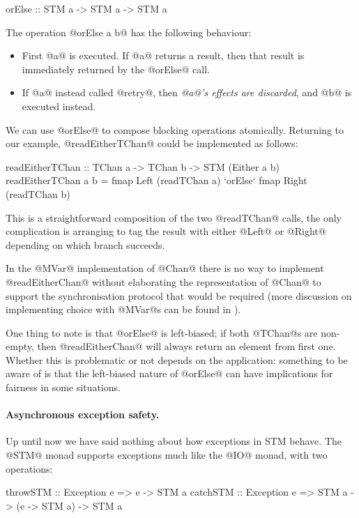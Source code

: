 \begin{haskell}
orElse :: STM a -> STM a -> STM a
\end{haskell}

\noindent The operation @orElse a b@ has the following behaviour:

\begin{itemize}
\item First @a@ is executed.  If @a@ returns a result, then that
  result is immediately returned by the @orElse@ call.
\item If @a@ instead called @retry@, then \emph{@a@'s effects are
  discarded}, and @b@ is executed instead.
\end{itemize}

We can use @orElse@ to compose blocking operations atomically.
Returning to our example, @readEitherTChan@ could be implemented as
follows:

\begin{haskell}
readEitherTChan :: TChan a -> TChan b -> STM (Either a b)
readEitherTChan a b =
  fmap Left (readTChan a)
    `orElse`
  fmap Right (readTChan b)
\end{haskell}

\noindent This is a straightforward composition of the two @readTChan@ calls,
the only complication is arranging to tag the result with either
@Left@ or @Right@ depending on which branch succeeds.

In the @MVar@ implementation of @Chan@ there is no way to implement
@readEitherChan@ without elaborating the representation of @Chan@ to
support the synchronisation protocol that would be required (more
discussion on implementing choice with @MVar@s can be found in
\citet{jones96concurrent}).

One thing to note is that @orElse@ is left-biased; if both @TChan@s
are non-empty, then @readEitherChan@ will always return an element
from first one.  Whether this is problematic or not depends on the
application: something to be aware of is that the left-biased nature
of @orElse@ can have implications for fairness in some situations.

\paragraph{Asynchronous exception safety.} Up until now we have said
nothing about how exceptions in STM behave.  The @STM@ monad supports
exceptions much like the @IO@ monad, with two operations:

\begin{haskell}
throwSTM  :: Exception e => e -> STM a
catchSTM  :: Exception e => STM a -> (e -> STM a) -> STM a
\end{haskell}


